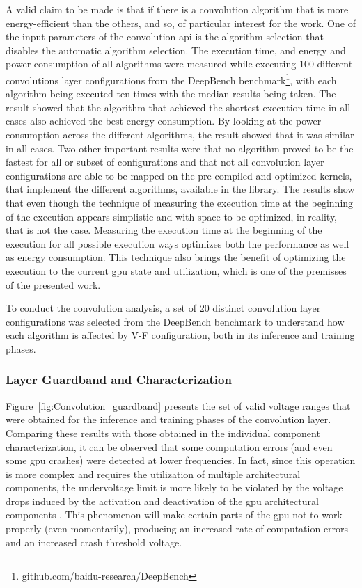 A valid claim to be made is that if there is a convolution algorithm that is more energy-efficient than the others, and so, of particular interest for the work. One of the input parameters of the convolution \acrshort{api} is the algorithm selection that disables the automatic algorithm selection. 
The execution time, and energy and power consumption of all algorithms were measured while executing 100 different convolutions layer configurations from the DeepBench benchmark\footnote{github.com/baidu-research/DeepBench}, with each algorithm being executed ten times with the median results being taken. The result showed that the algorithm that achieved the shortest execution time in all cases also achieved the best energy consumption. By looking at the power consumption across the different algorithms, the result showed that it was similar in all cases. Two other important results were that no algorithm proved to be the fastest for all or subset of configurations and that not all convolution layer configurations are able to be mapped on the pre-compiled and optimized kernels, that implement the different algorithms, available in the library. The results show that even though the technique of measuring the execution time at the beginning of the execution appears simplistic and with space to be optimized, in reality, that is not the case. Measuring the execution time at the beginning of the execution for all possible execution ways optimizes both the performance as well as energy consumption. This technique also brings the benefit of optimizing the execution to the current \acrshort{gpu} state and utilization, which is one of the premisses of the presented work.

To conduct the convolution analysis, a set of 20 distinct convolution layer configurations was selected from the DeepBench benchmark to understand how each algorithm is affected by V-F configuration, both in its inference and training phases.



\subsubsection{Layer Guardband and Characterization}

Figure~\ref{fig:Convolution_guardband} presents the set of valid voltage ranges that were obtained for the inference and training phases of the convolution layer. Comparing these results with those obtained in the individual component characterization, it can be observed that some computation errors (and even some \acrshort{gpu} crashes) were detected at lower frequencies. In fact, since this operation is more complex and requires the utilization of multiple architectural components, the undervoltage limit is more likely to be violated by the voltage drops induced by the activation and deactivation of the \acrshort{gpu}  architectural components \cite{thomas_core_2016}. This phenomenon will make certain parts of the \acrshort{gpu} not to work properly (even momentarily), producing an increased rate of computation errors and an increased crash threshold voltage. 


